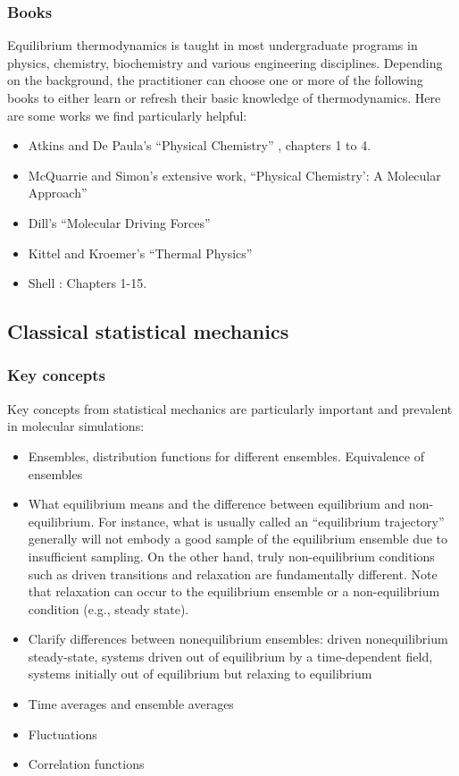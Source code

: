 \documentclass[9pt,bestpractices]{livecoms}
\begin{document}

\subsubsection{Books}
Equilibrium thermodynamics is taught in most undergraduate programs in physics, chemistry, biochemistry and various engineering disciplines.
Depending on the background, the practitioner can choose one or more of the following books to either learn or refresh their basic knowledge of thermodynamics. 
Here are some works we find particularly helpful:
\begin{itemize}
\item Atkins and De Paula's ``Physical Chemistry'' \cite{AtkinsBook}, chapters 1 to 4.
\item McQuarrie and Simon's extensive work, ``Physical Chemistry': A Molecular Approach''~\cite{McQuarrie:1997:}
\item Dill's ``Molecular Driving Forces''~\cite{DillBook}
\item Kittel and Kroemer's ``Thermal Physics''~\cite{Kittel:1980:}
\item Shell \cite{ShellBook}: Chapters 1-15.
\end{itemize}


\subsection{Classical statistical mechanics}
\label{sec:stat_mech}
\subsubsection{Key concepts}
Key concepts from statistical mechanics are particularly important and prevalent in molecular simulations:
\begin{itemize}
\item Ensembles, distribution functions for different ensembles. Equivalence of ensembles
\item What equilibrium means and the difference between equilibrium and non-equilibrium.
    For instance, what is usually called an ``equilibrium trajectory'' generally will not embody a good sample of the equilibrium ensemble due to insufficient sampling.  
        On the other hand, truly non-equilibrium conditions such as driven transitions and relaxation are fundamentally different. 
        Note that relaxation can occur to the equilibrium ensemble or a non-equilibrium condition (e.g., steady state).
\item Clarify differences between nonequilibrium ensembles: driven
    nonequilibrium steady-state, systems driven out of equilibrium by a time-dependent field, systems initially out of equilibrium but relaxing
        to equilibrium
\item Time averages and ensemble averages
\item Fluctuations
\item Correlation functions
\end{itemize}
\end{document}
